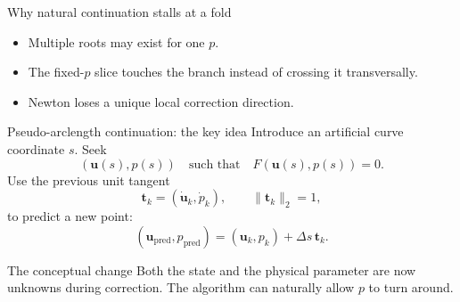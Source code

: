 \documentclass[aspectratio=169,10pt]{beamer}
\newcommand{\state}{\bm{u}}
\newcommand{\tangent}{\bm{t}}
\begin{document}
\begin{frame}{Why natural continuation stalls at a fold}
\centering
{}
\begin{itemize}
  \item Multiple roots may exist for one $p$.
  \item The fixed-$p$ slice touches the branch instead of crossing it transversally.
  \item Newton loses a unique local correction direction.
\end{itemize}
\end{frame}

\begin{frame}{Pseudo-arclength continuation: the key idea}
Introduce an artificial curve coordinate $s$. Seek
\[
  (\state(s),p(s)) \quad\text{such that}\quad F(\state(s),p(s))=0.
\]
Use the previous unit tangent
\[
  \tangent_k=(\dot{\state}_k,\dot p_k),
  \qquad \|\tangent_k\|_2=1,
\]
to predict a new point:
\[
  (\state_{\mathrm{pred}},p_{\mathrm{pred}})
  =(\state_k,p_k)+\Delta s\,\tangent_k.
\]
\begin{block}{The conceptual change}
Both the state and the physical parameter are now unknowns during correction. The algorithm can naturally allow $p$ to turn around.
\end{block}
\end{frame}
\end{document}
